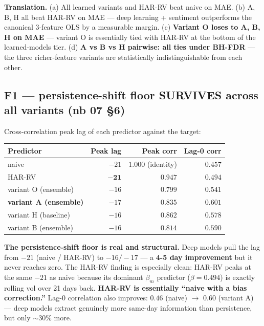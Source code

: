 \documentclass[11pt]{article}
\begin{document}
\textbf{Translation.} (a) All learned variants and HAR-RV beat naive on MAE. (b) A, B, H all beat HAR-RV on MAE --- deep learning + sentiment outperforms the canonical 3-feature OLS by a measurable margin. (c) \textbf{Variant O loses to A, B, H on MAE} --- variant O is essentially tied with HAR-RV at the bottom of the learned-models tier. (d) \textbf{A vs B vs H pairwise: all ties under BH-FDR} --- the three richer-feature variants are statistically indistinguishable from each other.

\subsection*{F1 --- persistence-shift floor SURVIVES across all variants (nb 07 \S 6)}

Cross-correlation peak lag of each predictor against the target:

\begin{center}
\renewcommand{\arraystretch}{1.15}
\begin{tabular}{@{}lrrr@{}}
\toprule
Predictor & Peak lag & Peak corr & Lag-0 corr \\
\midrule
naive                    & $-21$   & $1.000$ (identity) & $0.457$ \\
HAR-RV                   & $\mathbf{-21}$ & $0.947$ & $0.494$ \\
variant O (ensemble)     & $-16$   & $0.799$ & $0.541$ \\
\textbf{variant A (ensemble)} & $-17$ & $0.835$ & $\mathbf{0.601}$ \\
variant H (baseline)     & $-16$   & $0.862$ & $0.578$ \\
variant B (ensemble)     & $-16$   & $0.814$ & $0.590$ \\
\bottomrule
\end{tabular}
\end{center}

\textbf{The persistence-shift floor is real and structural.} Deep models pull the lag from $-21$ (naive / HAR-RV) to $-16/-17$ --- a \textbf{4-5 day improvement} but it never reaches zero. The HAR-RV finding is especially clean: HAR-RV peaks at the same $-21$ as naive because its dominant $\beta_m$ predictor ($\beta = 0.494$) is exactly rolling vol over 21 days back. \textbf{HAR-RV is essentially ``naive with a bias correction.''} Lag-0 correlation also improves: $0.46$ (naive) $\to$ $0.60$ (variant A) --- deep models extract genuinely more same-day information than persistence, but only $\sim 30\%$ more.
\end{document}
